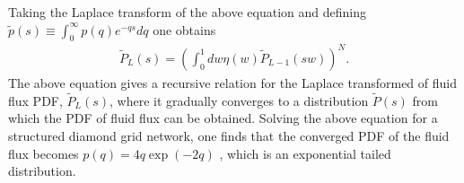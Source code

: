 \documentclass[%
 amsmath,amssymb,
prstper,
]{revtex4-2}
\def\lp{\left(}
\def\rp{\right)}
\begin{document}
Taking the Laplace transform of the above equation and defining $\tilde p(s)  \equiv \int_0^{\infty} p(q) e^{-qs} dq$ one obtains
%
%
%
\begin{align}
  {\tilde P_L(s) = \lp  \int_0^1 d w \eta(w) \tilde P_{L-1}(s w)  \rp^{N}}. \label{eq:main-laplace}
\end{align}
%
The above equation gives a recursive relation for the Laplace transformed of fluid flux PDF, $\tilde P_L(s)$, where it gradually converges to a distribution $\tilde P(s)$ from which the PDF of fluid flux can be obtained. Solving the above equation for a structured diamond grid network, one finds that the converged PDF of the fluid flux becomes $p(q) = 4q\exp(-2q)$ \cite{liu1995force,coppersmith1996model,alim2017local}, which is an exponential tailed distribution. 


\end{document}
